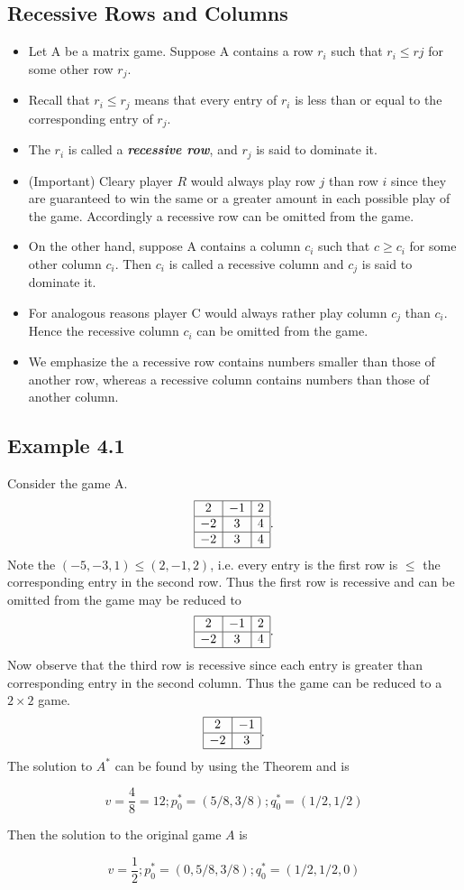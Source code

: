 \documentclass[]{report}
\begin{document}
\subsection{Recessive Rows and Columns}
\begin{itemize}
\item Let A be a matrix game. Suppose A contains a row $r_i$ such that $r_i \leq rj$ for some other
row $r_j$.
\item Recall that $r_i\leq r_j$ means that every entry of $r_i$ is less than or equal to the corresponding entry of $r_j$.
\item The $r_i$ is called a \textbf{\textit{recessive row}}, and $r_j$ is said to dominate it.
\item (Important)
Cleary player $R$ would always play row $j$ than row $i$ since they are guaranteed to win the same or a greater amount in each possible play of the game. Accordingly a recessive row can be omitted from the game.
\item 
On the other hand, suppose A contains a column $c_i$ such that $c \geq c_i$ for some other column $c_i$. Then $c_i$ is called
a recessive column and $c_j$ is said to dominate it.
\item 
For analogous reasons player C would always rather play column $c_j$ than $c_i$. Hence the recessive column $c_i$ can be
omitted from the game.
\item 
We emphasize the a recessive row contains numbers smaller than those of another
row, whereas a recessive column contains numbers than those of another column.
\end{itemize}
\subsection{Example 4.1}
Consider the game A.
\[
\begin{array}{|c|c|c|} \hline
2 & -1 & 2 \\ \hline
-2 & 3 & 4 \\ \hline
-2 & 3 & 4 \\ \hline
\end{array}.
\]
Note the $(-5,-3,1) \leq (2,-1,2)$, i.e. every entry is the first row is $\leq$ the corresponding entry in
the second row. Thus the first row is recessive and can be omitted from the game may be reduced to 
\[
\begin{array}{|c|c|c|} \hline
2 & -1 & 2 \\ \hline
-2 & 3 & 4 \\ \hline
\end{array}.
\]
Now observe that the third row is recessive since each entry is greater than corresponding entry in the second column.
Thus the game can be reduced to a $2 \times 2$ game.
\[
\begin{array}{|c|c|} \hline
2 & -1  \\ \hline
-2 & 3 \\ \hline
\end{array}.
\]
The solution to $A^{\ast}$ can be found by using the Theorem and is

\[ v = \frac{4}{8} = {1}{2} ; p^{\ast}_{0} =(5/8,3/8); q^{\ast}_{0} =(1/2,1/2) \]

Then the solution to the original game $A$ is


\[ v= \frac{1}{2} ; p^{\ast}_{0} =(0,5/8,3/8); q^{\ast}_{0} =(1/2,1/2,0) \]
\end{document}
